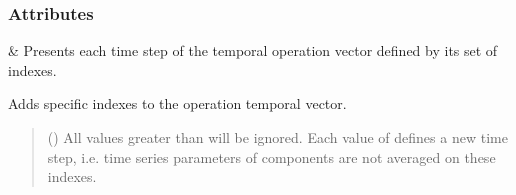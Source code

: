\documentclass[letterpaper,10pt,english]{sphinxmanual}
\begin{document}
\begin{fulllineitems}
\subsubsection*{Attributes}


\begin{savenotes}\sphinxattablestart
\centering
\begin{tabulary}{\linewidth}[t]{}
\hline

\sphinxAtStartPar
{\hyperref[\detokenize{generated/tamos.TimeSettings:tamos.TimeSettings.time_steps}]{}}
&
\sphinxAtStartPar
Presents each time step of the temporal operation vector defined by its set of indexes.
\\
\hline
\end{tabulary}
\par
\sphinxattableend\end{savenotes}

\begin{fulllineitems}
\label{\detokenize{generated/tamos.TimeSettings:tamos.TimeSettings.add}}
\pysigstartsignatures
{}
\pysigstopsignatures
\sphinxAtStartPar
Adds specific indexes to the operation temporal vector.
\begin{quote}\begin{description}
\sphinxAtStartPar
{} () \textendash{} All values greater than  will be ignored.
Each value of  defines a new time step,
i.e. time series parameters of components are not averaged on these indexes.

\end{description}\end{quote}

\end{fulllineitems}



\end{fulllineitems}
\end{document}
